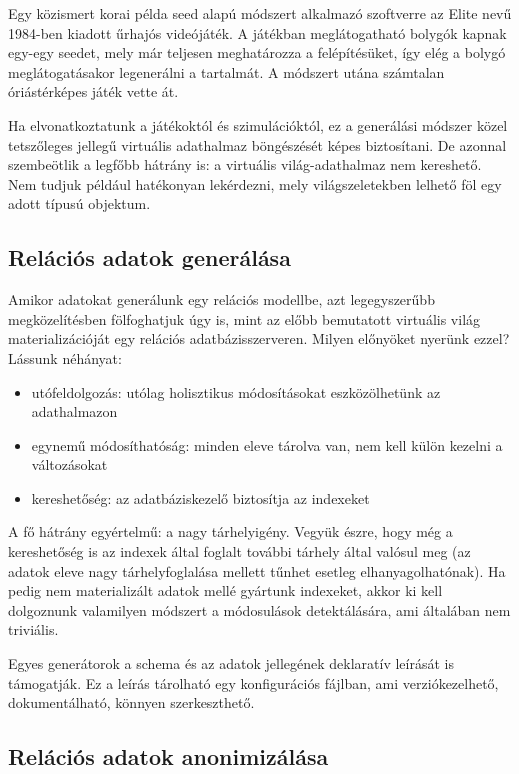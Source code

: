 \documentclass[
    parspace,
    noindent,
    nohyp,
]{elteiktdk}[2023/04/10]
\begin{document}
Egy közismert korai példa seed alapú módszert alkalmazó szoftverre
az Elite nevű 1984-ben kiadott űrhajós videójáték.
A játékban meglátogatható bolygók kapnak egy-egy seedet, mely már teljesen meghatározza a felépítésüket,
így elég a bolygó meglátogatásakor legenerálni a tartalmát.
A módszert utána számtalan óriástérképes játék vette át.

Ha elvonatkoztatunk a játékoktól és szimulációktól,
ez a generálási módszer közel tetszőleges jellegű virtuális adathalmaz böngészését képes biztosítani.
De azonnal szembeötlik a legfőbb hátrány is: a virtuális világ-adathalmaz nem kereshető.
Nem tudjuk például hatékonyan lekérdezni, mely világszeletekben lelhető föl egy adott típusú objektum.

\subsection{Relációs adatok generálása}

Amikor adatokat generálunk egy relációs modellbe, azt legegyszerűbb megközelítésben fölfoghatjuk úgy is,
mint az előbb bemutatott virtuális világ materializációját egy relációs adatbázisszerveren.
Milyen előnyöket nyerünk ezzel? Lássunk néhányat:

\begin{itemize}
    \item utófeldolgozás: utólag holisztikus módosításokat eszközölhetünk az adathalmazon
    \item egynemű módosíthatóság: minden eleve tárolva van, nem kell külön kezelni a változásokat
    \item kereshetőség: az adatbáziskezelő biztosítja az indexeket
\end{itemize}

A fő hátrány egyértelmű: a nagy tárhelyigény.
Vegyük észre, hogy még a kereshetőség is az indexek által foglalt további tárhely által valósul meg
(az adatok eleve nagy tárhelyfoglalása mellett tűnhet esetleg elhanyagolhatónak).
Ha pedig nem materializált adatok mellé gyártunk indexeket,
akkor ki kell dolgoznunk valamilyen módszert a módosulások detektálására, ami általában nem triviális.

Egyes generátorok a schema és az adatok jellegének deklaratív leírását is támogatják. Ez a leírás tárolható egy konfigurációs fájlban, ami verziókezelhető, dokumentálható, könnyen szerkeszthető.

\subsection{Relációs adatok anonimizálása}
\end{document}
